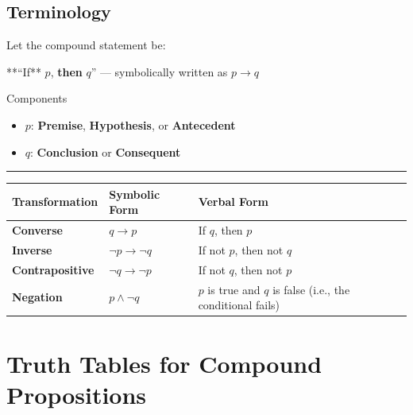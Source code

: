 \documentclass[
]{book}
\providecommand{\tightlist}{%
  \setlength{\itemsep}{0pt}\setlength{\parskip}{0pt}}
\theoremstyle{definition}
\theoremstyle{definition}
\theoremstyle{definition}
\theoremstyle{definition}
\theoremstyle{remark}
\begin{document}
\subsection{Terminology}\label{terminology}

Let the compound statement be:

**``If** \(p\), \textbf{then} \(q\)'' --- symbolically written as \(p \rightarrow q\)

Components

\begin{itemize}
\tightlist
\item
  \(p\): \textbf{Premise}, \textbf{Hypothesis}, or \textbf{Antecedent}
\item
  \(q\): \textbf{Conclusion} or \textbf{Consequent}
\end{itemize}

\begin{center}\rule{0.5\linewidth}{0.5pt}\end{center}

\begin{longtable}[]{@{}
  >{\raggedright\arraybackslash}p{}
  >{\raggedright\arraybackslash}p{}
  >{\raggedright\arraybackslash}p{}@{}}
\toprule\noalign{}
\begin{minipage}[b]{\linewidth}\raggedright
Transformation
\end{minipage} & \begin{minipage}[b]{\linewidth}\raggedright
Symbolic Form
\end{minipage} & \begin{minipage}[b]{\linewidth}\raggedright
Verbal Form
\end{minipage} \\
\midrule\noalign{}
\endhead
\bottomrule\noalign{}
\endlastfoot
\textbf{Converse} & \(q \rightarrow p\) & If \(q\), then \(p\) \\
\textbf{Inverse} & \(\neg p \rightarrow \neg q\) & If not \(p\), then not \(q\) \\
\textbf{Contrapositive} & \(\neg q \rightarrow \neg p\) & If not \(q\), then not \(p\) \\
\textbf{Negation} & \(p \land \neg q\) & \(p\) is true and \(q\) is false (i.e., the conditional fails) \\
\end{longtable}

\section{Truth Tables for Compound Propositions}\label{truth-tables-for-compound-propositions}
\end{document}
